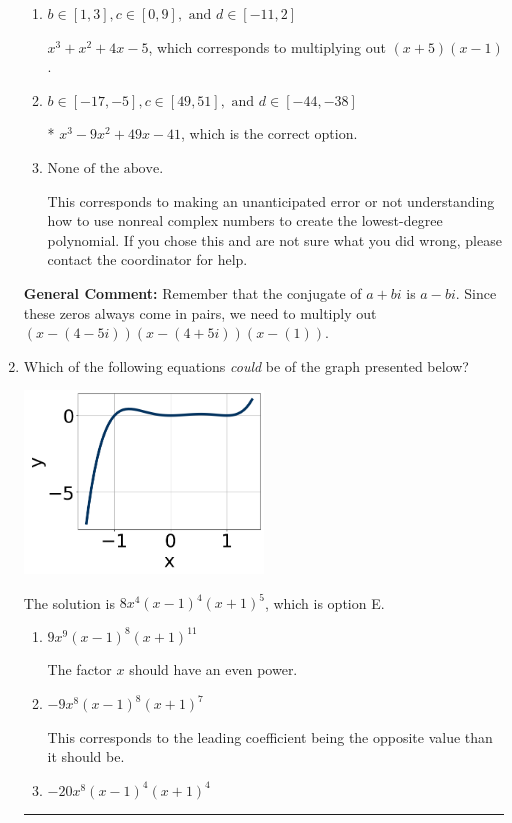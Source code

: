 \documentclass{extbook}[14pt]
\newcommand{\litem}[1]{\item #1

\rule{\textwidth}{0.4pt}}
\begin{document}
\begin{enumerate}
{\begin{enumerate}[label=\Alph*.]
$x^{3} +9 x^{2} +49 x + 41$, which corresponds to multiplying out $(x-(4 - 5 i))(x-(4 + 5 i))(x + 1)$.
\item \( b \in [1, 3], c \in [0, 9], \text{ and } d \in [-11, 2] \)

$x^{3} + x^{2} +4 x -5$, which corresponds to multiplying out $(x + 5)(x -1)$.
\item \( b \in [-17, -5], c \in [49, 51], \text{ and } d \in [-44, -38] \)

* $x^{3} -9 x^{2} +49 x -41$, which is the correct option.
\item \( \text{None of the above.} \)

This corresponds to making an unanticipated error or not understanding how to use nonreal complex numbers to create the lowest-degree polynomial. If you chose this and are not sure what you did wrong, please contact the coordinator for help.
\end{enumerate}

\textbf{General Comment:} Remember that the conjugate of $a+bi$ is $a-bi$. Since these zeros always come in pairs, we need to multiply out $(x-(4 - 5 i))(x-(4 + 5 i))(x-(1))$.
}
\litem{
Which of the following equations \textit{could} be of the graph presented below?

\begin{center}
    \includegraphics[width=0.5\textwidth]{../Figures/polyGraphToFunctionB.png}
\end{center}


The solution is \( 8x^{4} (x - 1)^{4} (x + 1)^{5} \), which is option E.\begin{enumerate}[label=\Alph*.]
\item \( 9x^{9} (x - 1)^{8} (x + 1)^{11} \)

The factor $x$ should have an even power.
\item \( -9x^{8} (x - 1)^{8} (x + 1)^{7} \)

This corresponds to the leading coefficient being the opposite value than it should be.
\item \( -20x^{8} (x - 1)^{4} (x + 1)^{4} \)


\end{enumerate}}
\end{enumerate}
\end{document}
